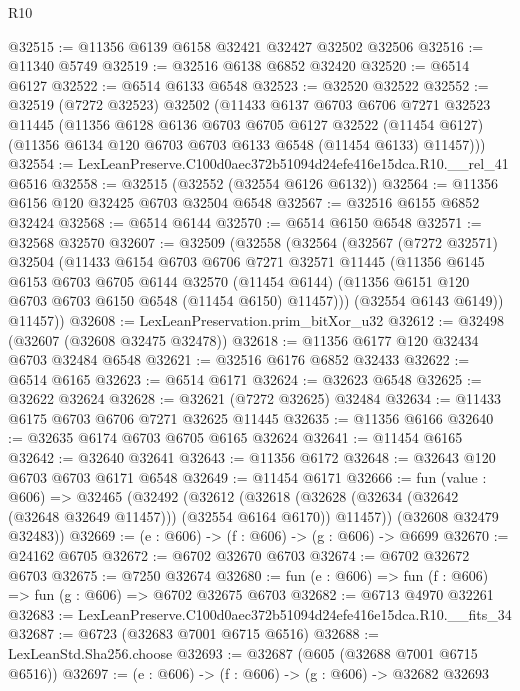 \begin{lexlean}{R10}
\begin{coremodule}
@32515 := @11356 @6139 @6158 @32421 @32427 @32502 @32506
@32516 := @11340 @5749
@32519 := @32516 @6138 @6852 @32420
@32520 := @6514 @6127
@32522 := @6514 @6133 @6548
@32523 := @32520 @32522
@32552 := @32519
    (@7272 @32523)
    @32502
    (@11433
      @6137
      @6703
      @6706
      @7271
      @32523
      @11445
      (@11356
        @6128
        @6136
        @6703
        @6705
        @6127
        @32522
        (@11454 @6127)
        (@11356 @6134 @120 @6703 @6703 @6133 @6548 (@11454 @6133) @11457)))
@32554 := LexLeanPreserve.C100d0aec372b51094d24efe416e15dca.R10.__rel_41 @6516
@32558 := @32515 (@32552 (@32554 @6126 @6132))
@32564 := @11356 @6156 @120 @32425 @6703 @32504 @6548
@32567 := @32516 @6155 @6852 @32424
@32568 := @6514 @6144
@32570 := @6514 @6150 @6548
@32571 := @32568 @32570
@32607 := @32509
    (@32558
      (@32564
        (@32567
          (@7272 @32571)
          @32504
          (@11433
            @6154
            @6703
            @6706
            @7271
            @32571
            @11445
            (@11356
              @6145
              @6153
              @6703
              @6705
              @6144
              @32570
              (@11454 @6144)
              (@11356 @6151 @120 @6703 @6703 @6150 @6548 (@11454 @6150) @11457)))
          (@32554 @6143 @6149))
        @11457))
@32608 := LexLeanPreservation.prim_bitXor_u32
@32612 := @32498 (@32607 (@32608 @32475 @32478))
@32618 := @11356 @6177 @120 @32434 @6703 @32484 @6548
@32621 := @32516 @6176 @6852 @32433
@32622 := @6514 @6165
@32623 := @6514 @6171
@32624 := @32623 @6548
@32625 := @32622 @32624
@32628 := @32621 (@7272 @32625) @32484
@32634 := @11433 @6175 @6703 @6706 @7271 @32625 @11445
@32635 := @11356 @6166
@32640 := @32635 @6174 @6703 @6705 @6165 @32624
@32641 := @11454 @6165
@32642 := @32640 @32641
@32643 := @11356 @6172
@32648 := @32643 @120 @6703 @6703 @6171 @6548
@32649 := @11454 @6171
@32666 := fun (value : @606) =>
  @32465
    (@32492
      (@32612
        (@32618 (@32628 (@32634 (@32642 (@32648 @32649 @11457))) (@32554 @6164 @6170)) @11457))
      (@32608 @32479 @32483))
@32669 := (e : @606) -> (f : @606) -> (g : @606) -> @6699
@32670 := @24162 @6705
@32672 := @6702 @32670 @6703
@32674 := @6702 @32672 @6703
@32675 := @7250 @32674
@32680 := fun (e : @606) => fun (f : @606) => fun (g : @606) => @6702 @32675 @6703
@32682 := @6713 @4970 @32261
@32683 := LexLeanPreserve.C100d0aec372b51094d24efe416e15dca.R10.__fits_34
@32687 := @6723 (@32683 @7001 @6715 @6516)
@32688 := LexLeanStd.Sha256.choose
@32693 := @32687 (@605 (@32688 @7001 @6715 @6516))
@32697 := (e : @606) -> (f : @606) -> (g : @606) -> @32682 @32693

\end{coremodule}
\end{lexlean}
